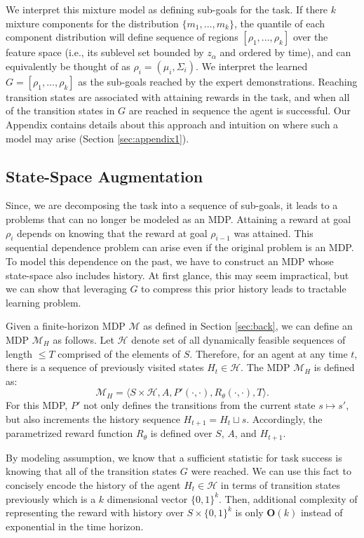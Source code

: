 We interpret this mixture model as defining sub-goals for the task.
If there $k$ mixture components for the distribution $\{m_1,...,m_k\}$, the quantile of each component distribution will define sequence of regions $[\rho_1,...,\rho_k]$ over the feature space (i.e., its sublevel set bounded by $z_\alpha$ and ordered by time), and can equivalently be thought of as $\rho_i = (\mu_i,\Sigma_i)$.
We interpret the learned $G = [\rho_1,...,\rho_k]$ as the sub-goals reached by the expert demonstrations.
Reaching transition states are associated with attaining rewards in the task, and when all of the transition states in $G$ are reached in sequence the agent is successful. 
Our Appendix contains details about this approach and intuition on where such a model may arise (Section \ref{sec:appendix1}).

\subsection{State-Space Augmentation}
Since, we are decomposing the task into a sequence of sub-goals, it leads to a problems that can no longer be modeled as an MDP.
Attaining a reward at goal $\rho_i$ depends on knowing that the reward at goal $\rho_{i-1}$ was attained.
This sequential dependence problem can arise even if the original problem is an MDP.
To model this dependence on the past, we have to construct an MDP whose state-space also includes history.
At first glance, this may seem impractical, but we can show that leveraging $G$ to compress this prior history leads to tractable learning problem.

Given a finite-horizon MDP $\mathcal{M}$ as defined in Section \ref{sec:back}, we can define an MDP $\mathcal{M}_H$ as follows.
Let $\mathcal{H}$ denote set of all dynamically feasible sequences of length $\le T$ comprised of the elements of $S$.
Therefore, for an agent at any time $t$, there is a sequence of previously visited states $H_t \in \mathcal{H}$.
The MDP $\mathcal{M}_H$ is defined as:
\[
\mathcal{M}_H = \langle S \times \mathcal{H},A,P'(\cdot,\cdot), R_\theta(\cdot,\cdot),T \rangle.
\]
For this MDP, $P'$ not only defines the transitions from the current state $s \mapsto s'$, but also increments the history sequence $H_{t+1} = H_{t} \sqcup s$.
Accordingly, the parametrized reward function $R_\theta$ is defined over $S$, $A$, and $H_{t+1}$.

By modeling assumption, we know that a sufficient statistic for task success is knowing that all of the transition states $G$ were reached.
We can use this fact to concisely encode the history of the agent $H_t \in \mathcal{H}$ in terms of transition states previously which is a $k$ dimensional vector $\{0,1\}^k$.
Then, additional complexity of representing the reward with history over $S \times  \{0,1\}^k$ is only $\mathbf{O}(k)$ instead of exponential in the time horizon.

